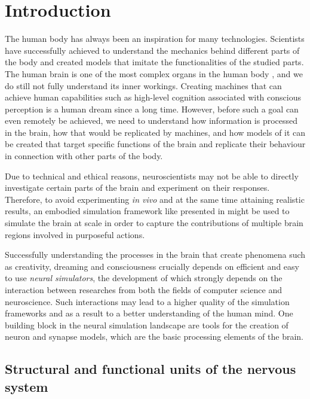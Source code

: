 \chapter{Introduction}
\label{chap:intro}

The human body has always been an inspiration for many technologies. Scientists have successfully achieved to understand the mechanics behind different parts of the body and created models that imitate the functionalities of the studied parts. The human brain is one of the most complex organs in the human body \citep{vanderah2020nolte}, and we do still not fully understand its inner workings. Creating machines that can achieve human capabilities such as high-level cognition associated with conscious perception is a human dream since a long time. However, before such a goal can even remotely be achieved, we need to understand how information is processed in the brain, how that would be replicated by machines, and how models of it can be created that target specific functions of the brain and replicate their behaviour in connection with other parts of the body.

Due to technical and ethical reasons, neuroscientists may not be able to directly investigate certain parts of the brain and experiment on their responses. Therefore, to avoid experimenting \emph{in vivo} and at the same time attaining realistic results, an embodied simulation framework like presented in \citet{10.3389/fninf.2022.884180} might be used to simulate the brain at scale in order to capture the contributions of multiple brain regions involved in purposeful actions.

Successfully understanding the processes in the brain that create phenomena such as creativity, dreaming and consciousness crucially depends on efficient and easy to use \emph{neural simulators}, the development of which strongly depends on the interaction between researches from both the fields of computer science and neuroscience. Such interactions may lead to a higher quality of the simulation frameworks and as a result to a better understanding of the human mind. One building block in the neural simulation landscape are tools for the creation of neuron and synapse models, which are the basic processing elements of the brain.

\section{Structural and functional units of the nervous system}

